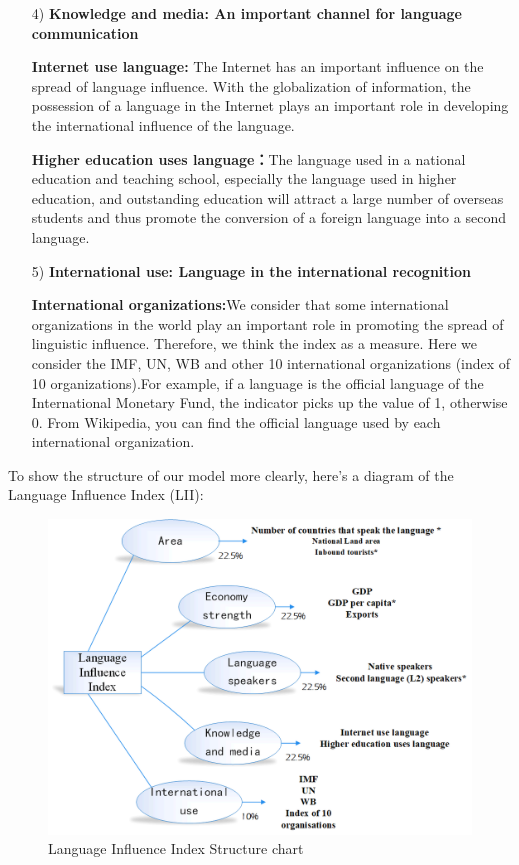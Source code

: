 \begin{enumerate}
	\item[4)] \textbf{Knowledge and media: An important channel for language communication}
	\par\textbf{Internet use language: } The Internet has an important influence on the spread of language influence. With the globalization of information, the possession of a language in the Internet plays an important role in developing the international influence of the language.
	\par \textbf{Higher education uses language：}The language used in a national education and teaching school, especially the language used in higher education, and outstanding education will attract a large number of overseas students and thus promote the conversion of a foreign language into a second language.
	
	\item[5)] \textbf{International use: Language in the international recognition}
	\par \textbf{International organizations:}We consider that some international organizations in the world play an important role in promoting the spread of linguistic influence. Therefore, we think the index as a measure. Here we consider the IMF, UN, WB and other 10 international organizations (index of 10 organizations).For example, if a language is the official language of the International Monetary Fund, the indicator picks up the value of 1, otherwise 0. From Wikipedia, you can find the official language used by each international organization.
	
\end{enumerate}

\par To show the structure of our model more clearly, here's a diagram of the Language Influence Index (LII):

\begin{figure}[H]
	\centering
	\includegraphics[width=0.7\linewidth]{figures/chart}
	\caption{Language Influence Index Structure chart}
	\label{fig:chart}
\end{figure}

